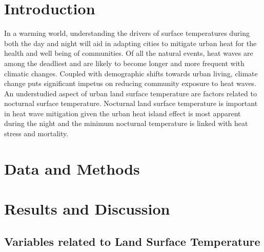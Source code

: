 \documentclass[]{elsarticle}
\begin{document}
\linenumbers

\section{Introduction}
In a warming world, understanding the drivers of surface temperatures during both the day and night will aid in adapting cities to mitigate urban heat for the health and well being of communities.
Of all the natural events, heat waves are among the deadliest and are likely to become longer and more frequent with climatic changes.
Coupled with demographic shifts towards urban living, climate change puts significant impetus on reducing community exposure to heat waves.
An understudied aspect of urban land surface temperature are factors related to nocturnal surface temperature.
Nocturnal land surface temperature is important in heat wave mitigation given the urban heat island effect is most apparent during the night and the minimum nocturnal temperature is linked with heat stress and mortality.



\section{Data and Methods}


\section{Results and Discussion}

\subsection{Variables related to Land Surface Temperature}
\end{document}
